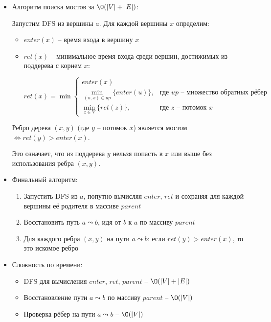 \begin{enumerate}
\begin{enumerate}
\begin{itemize}
        \item Алгоритм поиска мостов за $\O(|V| + |E|)$:

        Запустим DFS из вершины $a$. Для каждой вершины $x$ определим:
        \begin{itemize}
          \item $enter(x)$ -- время входа в вершину $x$
          \item $ret(x)$ -- минимальное время входа среди вершин, достижимых из поддерева с корнем $x$:

          $$ret(x) = \min\begin{cases}
            enter(x) \\
            \min_{(u, x) \in up} \{ enter(u) \}, & \text{где } up \text{ -- множество обратных рёбер} \\
            \min_{z \in V} \{ ret(z) \}, & \text{где } z \text{ -- потомок } x
          \end{cases}$$

        \end{itemize}

        Ребро дерева $(x, y)$ (где $y$ -- потомок $x$) является мостом $\Leftrightarrow ret(y) > enter(x)$.
        
        Это означает, что из поддерева $y$ нельзя попасть в $x$ или выше без использования ребра $(x, y)$.

        \item Финальный алгоритм:
        \begin{enumerate}
          \item Запустить DFS из $a$, попутно вычисляя $enter$, $ret$ и сохраняя для каждой вершины её родителя в массиве $parent$
          \item Восстановить путь $a \leadsto b$, идя от $b$ к $a$ по массиву $parent$
          \item Для каждого ребра $(x, y)$ на пути $a \leadsto b$: если $ret(y) > enter(x)$, то это искомое ребро
        \end{enumerate}

        \item Сложность по времени:
        \begin{itemize}
          \item DFS для вычисления $enter$, $ret$, $parent$ -- $\O(|V| + |E|)$
          \item Восстановление пути $a \leadsto b$ по массиву $parent$ -- $\O(|V|)$
          \item Проверка рёбер на пути $a \leadsto b$ -- $\O(|V|)$
        \end{itemize}
        

\end{itemize}
\end{enumerate}
\end{enumerate}
